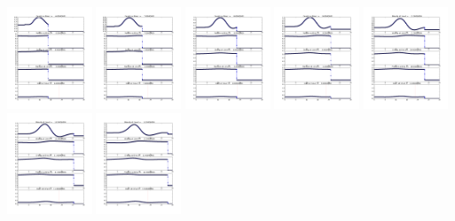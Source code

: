 \documentclass[11pt]{article}
\begin{document}
\vskip 10pt 
\includegraphics[width=0.19\textwidth]{frame0006fig1.png}
\vskip 10pt 
\includegraphics[width=0.19\textwidth]{frame0007fig1.png}
\vskip 10pt 
\includegraphics[width=0.19\textwidth]{frame0008fig1.png}
\vskip 10pt 
\includegraphics[width=0.19\textwidth]{frame0009fig1.png}
\vskip 10pt 
\includegraphics[width=0.19\textwidth]{frame0010fig1.png}
\vskip 10pt 
\includegraphics[width=0.19\textwidth]{frame0011fig1.png}
\vskip 10pt 
\includegraphics[width=0.19\textwidth]{frame0012fig1.png}
\end{document}
